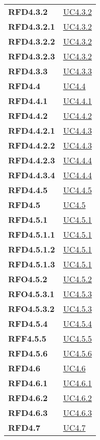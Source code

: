 \begin{longtable}[H]{|>{\centering\bfseries}m{8cm} | >{\centering\arraybackslash}m{8cm} |}
    RFD4.3.2 & \hyperref[par:uc4.3.2]{UC4.3.2} \\
    RFD4.3.2.1 & \hyperref[par:uc4.3.2]{UC4.3.2} \\
    RFD4.3.2.2 & \hyperref[par:uc4.3.2]{UC4.3.2} \\
    RFD4.3.2.3 & \hyperref[par:uc4.3.2]{UC4.3.2} \\
    RFD4.3.3 & \hyperref[par:uc4.3.3]{UC4.3.3} \\
    RFD4.4 & \hyperref[ssub:uc4.4]{UC4.4} \\
    RFD4.4.1 & \hyperref[par:uc4.4.1]{UC4.4.1} \\
    RFD4.4.2 & \hyperref[par:uc4.4.1]{UC4.4.2} \\
    RFD4.4.2.1 & \hyperref[par:uc4.4.3]{UC4.4.3} \\
    RFD4.4.2.2 & \hyperref[par:uc4.4.3]{UC4.4.3} \\
    RFD4.4.2.3 & \hyperref[par:uc4.4.4]{UC4.4.4} \\
    RFD4.4.3.4 & \hyperref[par:uc4.4.4]{UC4.4.4} \\
    RFD4.4.5 & \hyperref[par:uc4.4.5]{UC4.4.5} \\
    RFD4.5 & \hyperref[ssub:uc4.5]{UC4.5} \\
    RFD4.5.1 & \hyperref[par:uc4.5.1]{UC4.5.1} \\
    RFD4.5.1.1 & \hyperref[par:uc4.5.1]{UC4.5.1} \\
    RFD4.5.1.2 & \hyperref[par:uc4.5.1]{UC4.5.1} \\
    RFD4.5.1.3 & \hyperref[par:uc4.5.1]{UC4.5.1} \\
    RFO4.5.2 & \hyperref[par:uc4.5.2]{UC4.5.2} \\
    RFO4.5.3.1 & \hyperref[par:uc4.5.3]{UC4.5.3} \\
    RFO4.5.3.2 & \hyperref[par:uc4.5.3]{UC4.5.3} \\
    RFD4.5.4 & \hyperref[par:uc4.5.4]{UC4.5.4} \\
    RFF4.5.5 & \hyperref[par:uc4.5.5]{UC4.5.5} \\
    RFD4.5.6 & \hyperref[par:uc4.5.6]{UC4.5.6} \\
    RFD4.6 & \hyperref[ssub:uc4.6]{UC4.6} \\
    RFD4.6.1 & \hyperref[par:uc4.6.1]{UC4.6.1} \\
    RFD4.6.2 & \hyperref[par:uc4.6.2]{UC4.6.2} \\
    RFD4.6.3 & \hyperref[par:uc4.6.3]{UC4.6.3} \\
    RFD4.7 & \hyperref[ssub:uc4.7]{UC4.7} \\

\end{longtable}
